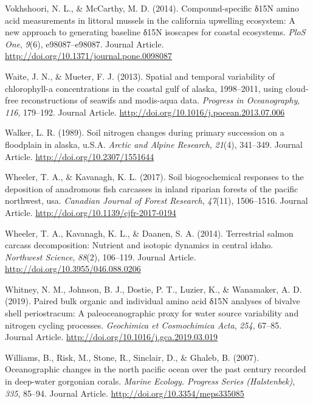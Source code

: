 \documentclass [11pt, proquest] {uwthesis}[2015/03/03]
\begin{document}
\hypertarget{ref-Vokshoori2014}{}
Vokhshoori, N. L., \& McCarthy, M. D. (2014). Compound-specific δ15N
amino acid measurements in littoral mussels in the california upwelling
ecosystem: A new approach to generating baseline δ15N isoscapes for
coastal ecosystems. \emph{PloS One}, \emph{9}(6), e98087--e98087.
Journal Article. \url{http://doi.org/10.1371/journal.pone.0098087}

\hypertarget{ref-Waite2013}{}
Waite, J. N., \& Mueter, F. J. (2013). Spatial and temporal variability
of chlorophyll-a concentrations in the coastal gulf of alaska,
1998--2011, using cloud-free reconstructions of seawifs and modis-aqua
data. \emph{Progress in Oceanography}, \emph{116}, 179--192. Journal
Article. \url{http://doi.org/10.1016/j.pocean.2013.07.006}

\hypertarget{ref-Walker1989}{}
Walker, L. R. (1989). Soil nitrogen changes during primary succession on
a floodplain in alaska, u.S.A. \emph{Arctic and Alpine Research},
\emph{21}(4), 341--349. Journal Article.
\url{http://doi.org/10.2307/1551644}

\hypertarget{ref-Wheeler2017}{}
Wheeler, T. A., \& Kavanagh, K. L. (2017). Soil biogeochemical responses
to the deposition of anadromous fish carcasses in inland riparian
forests of the pacific northwest, usa. \emph{Canadian Journal of Forest
Research}, \emph{47}(11), 1506--1516. Journal Article.
\url{http://doi.org/10.1139/cjfr-2017-0194}

\hypertarget{ref-Wheeler2014}{}
Wheeler, T. A., Kavanagh, K. L., \& Daanen, S. A. (2014). Terrestrial
salmon carcass decomposition: Nutrient and isotopic dynamics in central
idaho. \emph{Northwest Science}, \emph{88}(2), 106--119. Journal
Article. \url{http://doi.org/10.3955/046.088.0206}

\hypertarget{ref-Whitney2019}{}
Whitney, N. M., Johnson, B. J., Dostie, P. T., Luzier, K., \& Wanamaker,
A. D. (2019). Paired bulk organic and individual amino acid δ15N
analyses of bivalve shell periostracum: A paleoceanographic proxy for
water source variability and nitrogen cycling processes.
\emph{Geochimica et Cosmochimica Acta}, \emph{254}, 67--85. Journal
Article. \url{http://doi.org/10.1016/j.gca.2019.03.019}

\hypertarget{ref-Williams2007}{}
Williams, B., Risk, M., Stone, R., Sinclair, D., \& Ghaleb, B. (2007).
Oceanographic changes in the north pacific ocean over the past century
recorded in deep-water gorgonian corals. \emph{Marine Ecology. Progress
Series (Halstenbek)}, \emph{335}, 85--94. Journal Article.
\url{http://doi.org/10.3354/meps335085}
\end{document}

